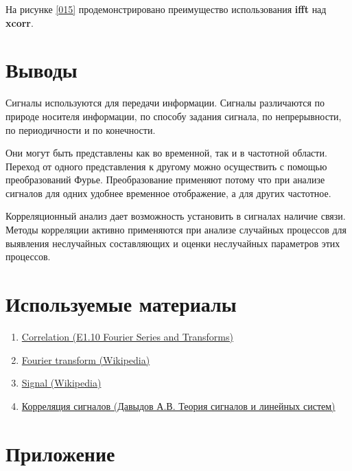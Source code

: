 \documentclass[a4paper,14pt]{extarticle}
\begin{document}
На рисунке \ref{015}  продемонстрировано преимущество использования \textbf{ifft} над \textbf{xcorr}.



\section{Выводы}

Сигналы используются для передачи информации. Сигналы 
различаются по природе носителя информации, по способу 
задания сигнала, по непрерывности, по периодичности и по 
конечности.

Они могут быть представлены как во временной, так и в 
частотной области. Переход от одного представления к другому 
можно осуществить с помощью преобразований Фурье. Преобразование применяют потому что при анализе сигналов для одних удобнее временное отображение, а для других частотное.

Корреляционный анализ дает возможность установить в сигналах наличие связи. Методы корреляции активно применяются при анализе случайных процессов для выявления неслучайных составляющих и оценки неслучайных параметров этих процессов.


\section{Используемые материалы}

\begin{enumerate}
\item \href{http://www.ee.ic.ac.uk/hp/staff/dmb/courses/E1Fourier/00800_Correlation.pdf}{Correlation (E1.10 Fourier Series and Transforms)}

\item \href{https://en.wikipedia.org/wiki/Fourier_transform}{Fourier transform (Wikipedia)}

\item \href{https://en.wikipedia.org/wiki/Signal}{Signal (Wikipedia)}

\item \href{http://bourabai.kz/signals/ts08.htm}{Корреляция сигналов (Давыдов А.В. Теория сигналов и линейных систем)}
\end{enumerate}

\newpage

\section{Приложение}



\newpage



\newpage


\end{document}
